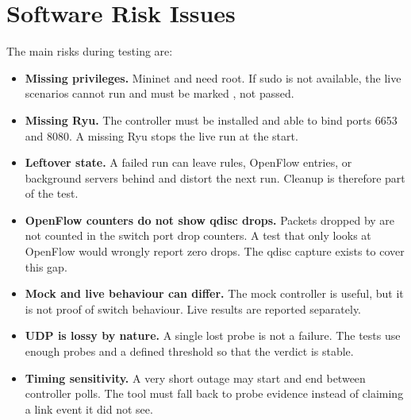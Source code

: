 \documentclass[11pt,a4paper]{article}
\newcommand{\code}[1]{\texttt{\detokenize{#1}}}
\begin{document}
\section{Software Risk Issues}
The main risks during testing are:
\begin{itemize}
  \item \textbf{Missing privileges.} Mininet and \code{tc} need root. If sudo is not available, the live scenarios cannot run and must be marked \code{NOT RUN}, not passed.
  \item \textbf{Missing Ryu.} The controller must be installed and able to bind ports 6653 and 8080. A missing Ryu stops the live run at the start.
  \item \textbf{Leftover state.} A failed run can leave \code{tc} rules, OpenFlow entries, or background servers behind and distort the next run. Cleanup is therefore part of the test.
  \item \textbf{OpenFlow counters do not show qdisc drops.} Packets dropped by \code{netem} are not counted in the switch port drop counters. A test that only looks at OpenFlow would wrongly report zero drops. The qdisc capture exists to cover this gap.
  \item \textbf{Mock and live behaviour can differ.} The mock controller is useful, but it is not proof of switch behaviour. Live results are reported separately.
  \item \textbf{UDP is lossy by nature.} A single lost probe is not a failure. The tests use enough probes and a defined threshold so that the verdict is stable.
  \item \textbf{Timing sensitivity.} A very short outage may start and end between controller polls. The tool must fall back to probe evidence instead of claiming a link event it did not see.
\end{itemize}

\end{document}
